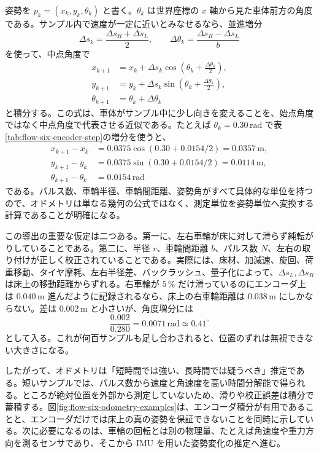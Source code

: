 姿勢を $p_k=(x_k,y_k,\theta_k)$ と書く。$\theta_k$ は世界座標の $x$ 軸から見た車体前方の角度である。サンプル内で速度が一定に近いとみなせるなら、並進増分
\begin{equation}
  \Delta s_k=\frac{\Delta s_R+\Delta s_L}{2},
  \qquad
  \Delta\theta_k=\frac{\Delta s_R-\Delta s_L}{b}
\end{equation}
を使って、中点角度で
\begin{align}
  x_{k+1}
  &=x_k+\Delta s_k\cos\left(\theta_k+\frac{\Delta\theta_k}{2}\right),\\
  y_{k+1}
  &=y_k+\Delta s_k\sin\left(\theta_k+\frac{\Delta\theta_k}{2}\right),\\
  \theta_{k+1}
  &=\theta_k+\Delta\theta_k
  \label{eq:odometry-midpoint-step}
\end{align}
と積分する。この式は、車体がサンプル中に少し向きを変えることを、始点角度ではなく中点角度で代表させる近似である。たとえば $\theta_k=0.30\,\mathrm{rad}$ で表\ref{tab:flow-six-encoder-step}の増分を使うと、
\begin{align}
  x_{k+1}-x_k
  &=0.0375\cos(0.30+0.0154/2)
    =0.0357\,\mathrm{m},\\
  y_{k+1}-y_k
  &=0.0375\sin(0.30+0.0154/2)
    =0.0114\,\mathrm{m},\\
  \theta_{k+1}-\theta_k
  &=0.0154\,\mathrm{rad}
\end{align}
である。パルス数、車輪半径、車輪間距離、姿勢角がすべて具体的な単位を持つので、オドメトリは単なる幾何の公式ではなく、測定単位を姿勢単位へ変換する計算であることが明確になる。

この導出の重要な仮定は二つある。第一に、左右車輪が床に対して滑らず純転がりしていることである。第二に、半径 $r$、車輪間距離 $b$、パルス数 $N$、左右の取り付けが正しく校正されていることである。実際には、床材、加減速、旋回、荷重移動、タイヤ摩耗、左右半径差、バックラッシュ、量子化によって、$\Delta s_L,\Delta s_R$ は床上の移動距離からずれる。右車輪が $5\,\%$ だけ滑っているのにエンコーダ上は $0.040\,\mathrm{m}$ 進んだように記録されるなら、床上の右車輪距離は $0.038\,\mathrm{m}$ にしかならない。差は $0.002\,\mathrm{m}$ と小さいが、角度増分には
\begin{equation}
  \frac{0.002}{0.280}
  =0.0071\,\mathrm{rad}
  \simeq0.41^\circ
\end{equation}
として入る。これが何百サンプルも足し合わされると、位置のずれは無視できない大きさになる。

したがって、オドメトリは「短時間では強い、長時間では疑うべき」推定である。短いサンプルでは、パルス数から速度と角速度を高い時間分解能で得られる。ところが絶対位置を外部から測定していないため、滑りや校正誤差は積分で蓄積する。図\ref{fig:flow-six-odometry-examples}は、エンコーダ積分が有用であることと、エンコーダだけでは床上の真の姿勢を保証できないことを同時に示している。次に必要になるのは、車輪の回転とは別の物理量、たとえば角速度や重力方向を測るセンサであり、そこから IMU を用いた姿勢変化の推定へ進む。
